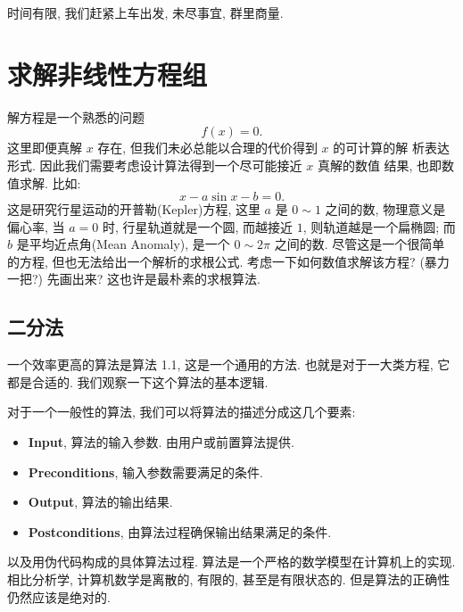 \documentclass[a4paper]{ctexart}
\newcommand{\remark}[1]
{\noindent {\bf Remark {#1}}}
\begin{document}
时间有限, 我们赶紧上车出发, 未尽事宜, 群里商量.


\section{求解非线性方程组}
\label{sec::sne}

\remark{1.1} 解方程是一个熟悉的问题
\begin{equation}
  f(x) = 0.
  \label{eq::ge}
\end{equation}
这里即便真解 $x$ 存在, 但我们未必总能以合理的代价得到 $x$ 的可计算的解
析表达形式. 因此我们需要考虑设计算法得到一个尽可能接近 $x$ 真解的数值
结果, 也即数值求解. 比如:
\begin{equation}
  x - a \sin x - b = 0.
  \label{eq::Kepler}
\end{equation}
这是研究行星运动的开普勒(Kepler)方程, 这里 $a$ 是 $0 \sim 1$ 之间的数, 物理意义是偏心率, 
当 $a = 0$ 时, 行星轨道就是一个圆, 而越接近 $1$, 则轨道越是一个扁椭圆; 而 $b$ 是平均近点角(Mean Anomaly), 
是一个 $0 \sim 2 \pi$ 之间的数. 尽管这是一个很简单的方程, 但也无法给出一个解析的求根公式. 
考虑一下如何数值求解该方程? (暴力一把?) 先画出来? 这也许是最朴素的求根算法.

\subsection{二分法}
一个效率更高的算法是算法 1.1, 这是一个通用的方法. 也就是对于一大类方程, 它都是合适的. 
我们观察一下这个算法的基本逻辑.

对于一个一般性的算法, 我们可以将算法的描述分成这几个要素:
\begin{itemize}
  \item {\bf Input}, 算法的输入参数. 由用户或前置算法提供.
  \item {\bf Preconditions}, 输入参数需要满足的条件. 
  \item {\bf Output}, 算法的输出结果.
  \item {\bf Postconditions}, 由算法过程确保输出结果满足的条件.
\end{itemize}
以及用伪代码构成的具体算法过程. 算法是一个严格的数学模型在计算机上的实现. 
相比分析学, 计算机数学是离散的, 有限的, 甚至是有限状态的. 
但是算法的正确性仍然应该是绝对的.
\end{document}
